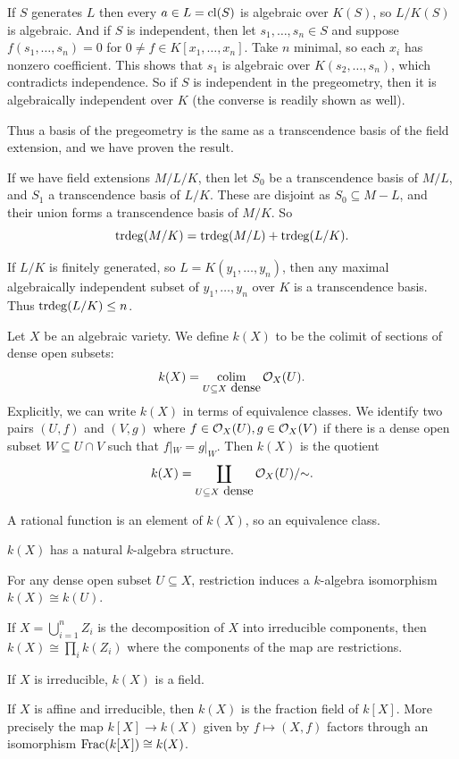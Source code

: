     If $S$ generates $L$ then every $a\in L={\rm cl}(S)$ is algebraic over $K(S)$, so $L/K(S)$ is algebraic.
    And if $S$ is independent, then let $s_1,\dots,s_n\in S$ and suppose $f(s_1,\dots,s_n)=0$ for $0\neq f\in K[x_1,\dots,x_n]$.
    Take $n$ minimal, so each $x_i$ has nonzero coefficient.
    This shows that $s_1$ is algebraic over $K(s_2,\dots,s_n)$, which contradicts independence.
    So if $S$ is independent in the pregeometry, then it is algebraically independent over $K$ (the converse is readily shown as well).

    Thus a basis of the pregeometry is the same as a transcendence basis of the field extension, and we have proven the result.

\enote

If we have field extensions $M/L/K$, then let $S_0$ be a transcendence basis of $M/L$, and $S_1$ a transcendence basis of $L/K$.
These are disjoint as $S_0\subseteq M-L$, and their union forms a transcendence basis of $M/K$.
So
$$ {\mathop{\rm trdeg}}(M/K) = {\mathop{\rm trdeg}}(M/L) + {\mathop{\rm trdeg}}(L/K) . $$

If $L/K$ is finitely generated, so $L=K(y_1,\dots,y_n)$, then any maximal algebraically independent subset of $y_1,\dots,y_n$ over $K$ is a transcendence basis.
Thus ${\mathop{\rm trdeg}}(L/K)\leq n$.

\bdefn

    Let $X$ be an algebraic variety.
    We define $k(X)$ to be the colimit of sections of dense open subsets:
    $$ k(X) = \mathop{\rm colim}\limits_{U\subseteq X\hbox{ dense}}{{\cal O}}_X(U) . $$
    Explicitly, we can write $k(X)$ in terms of equivalence classes.
    We identify two pairs $(U,f)$ and $(V,g)$ where $f\in{{\cal O}}_X(U),g\in{{\cal O}}_X(V)$ if there is a dense open subset $W\subseteq U\cap V$ such that $f|_W=g|_W$.
    Then $k(X)$ is the quotient
    $$ k(X) = \coprod_{U\subseteq X\hbox{ dense}}{{\cal O}}_X(U)/{\sim} . $$

    A {\emphcolor rational function} is an element of $k(X)$, so an equivalence class.

\edefn

\blemm

    \benum
        \item $k(X)$ has a natural $k$-algebra structure.
        \item For any dense open subset $U\subseteq X$, restriction induces a $k$-algebra isomorphism $k(X)\cong k(U)$.
        \item If $X=\bigcup_{i=1}^nZ_i$ is the decomposition of $X$ into irreducible components, then $k(X)\cong\prod_ik(Z_i)$ where the components of the map
        are restrictions.
        \item If $X$ is irreducible, $k(X)$ is a field.
        \item If $X$ is affine and irreducible, then $k(X)$ is the fraction field of $k[X]$.
        More precisely the map $k[X]\to k(X)$ given by $f\mapsto(X,f)$ factors through an isomorphism ${\rm Frac}(k[X])\cong k(X)$.
    \eenum

